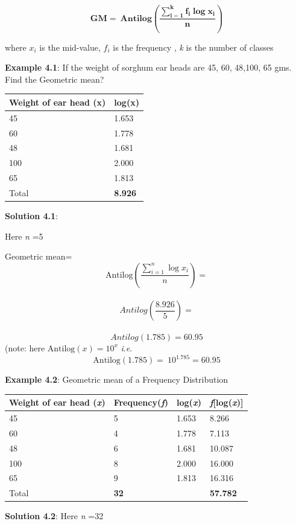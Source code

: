 \documentclass[
]{book}
\begin{document}
\[\mathbf{GM = \ Antilog}\left( \frac{\sum_{\mathbf{i = 1}}^{\mathbf{k}}{{\mathbf{f}_{\mathbf{i}}\mathbf{\log}}\mathbf{x}_{\mathbf{i}}}}{\mathbf{n}} \right)\]

where \(x_{i}\) is the mid-value, \(f_{i}\) is the frequency , \emph{k} is the
number of classes

\textbf{Example 4.1}: If the weight of sorghum ear heads are 45, 60, 48,100,
65 gms. Find the Geometric mean?

\begin{longtable}[]{@{}ll@{}}
\toprule
Weight of ear head (x) & log(x) \\
\midrule
\endhead
45 & 1.653 \\
60 & 1.778 \\
48 & 1.681 \\
100 & 2.000 \\
65 & 1.813 \\
Total & \textbf{8.926} \\
\bottomrule
\end{longtable}

\textbf{Solution 4.1}:

Here \emph{n} =5

Geometric mean=\\
\[\text{Antilog}\left( \frac{\sum_{i = 1}^{n}{\log x_{i}}}{n} \right) =\]\\
\[Antilog\left( \frac{8.926}{5} \right) =\]\\
\[ Antilog(1.785) = 60.95\]
(note: here \(\text{Antilog}\left( x \right) = 10^{x}\) \emph{i}.\emph{e}.
\[\text{Antilog}\left( 1.785 \right) = \ 10^{1.785} = 60.95\]

\textbf{Example 4.2}: Geometric mean of a Frequency Distribution

\begin{longtable}[]{@{}llll@{}}
\toprule
Weight of ear head (\emph{x}) & Frequency(\emph{f}) & log(\emph{x}) & \emph{f}{[}log(\emph{x}){]} \\
\midrule
\endhead
45 & 5 & 1.653 & 8.266 \\
60 & 4 & 1.778 & 7.113 \\
48 & 6 & 1.681 & 10.087 \\
100 & 8 & 2.000 & 16.000 \\
65 & 9 & 1.813 & 16.316 \\
Total & \textbf{32} & & \textbf{57.782} \\
\bottomrule
\end{longtable}

\textbf{Solution 4.2}:
Here \emph{n} =32
\end{document}
